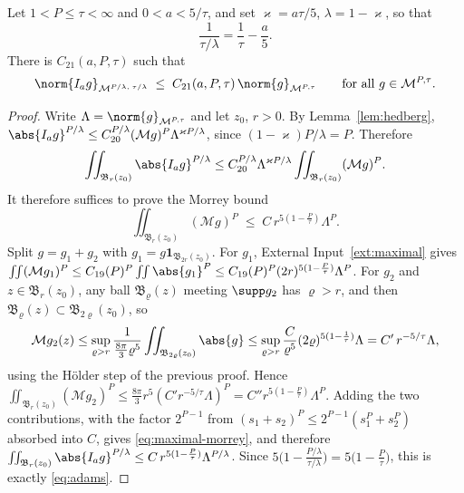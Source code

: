 \documentclass[11pt,reqno]{amsart}
\begin{document}
\begin{corollary}\label{cor:adams}
Let $1<P\le\tau<\infty$ and $0<a<5/\tau$, and set $\varkappa=a\tau/5$,
$\lambda=1-\varkappa$, so that
\begin{equation}\label{eq:adams-exponents}
  \frac{1}{\tau/\lambda}=\frac1\tau-\frac a5 .
\end{equation}
There is $C_{21}(a,P,\tau)$ such that
\begin{equation}\label{eq:adams}
  \norm{I_{a}g}_{\mathcal{M}^{P/\lambda,\;\tau/\lambda}}
  \;\le\;C_{21}(a,P,\tau)\,\norm{g}_{\mathcal{M}^{P,\tau}}
  \qquad\text{for all }g\in\mathcal{M}^{P,\tau}.
\end{equation}
\end{corollary}

\begin{proof}
Write $\Lambda=\norm{g}_{\mathcal{M}^{P,\tau}}$ and let $z_{0}$, $r>0$. By
Lemma~\ref{lem:hedberg},
$\abs{I_{a}g}^{P/\lambda}\le C_{20}^{P/\lambda}
  (\mathcal{M}g)^{P}\Lambda^{\varkappa P/\lambda}$, since
$(1-\varkappa)P/\lambda=P$. Therefore
\[
  \iint_{\mathfrak{B}_{r}(z_{0})}\abs{I_{a}g}^{P/\lambda}
  \le C_{20}^{P/\lambda}\Lambda^{\varkappa P/\lambda}
     \iint_{\mathfrak{B}_{r}(z_{0})}(\mathcal{M}g)^{P} .
\]
It therefore suffices to prove the Morrey bound
\begin{equation}\label{eq:maximal-morrey}
  \iint_{\mathfrak{B}_{r}(z_{0})}(\mathcal{M}g)^{P}
  \;\le\;C\,r^{5(1-\frac P\tau)}\Lambda^{P}.
\end{equation}
Split $g=g_{1}+g_{2}$ with $g_{1}=g\mathbf{1}_{\mathfrak{B}_{2r}(z_{0})}$. For
$g_{1}$, External Input~\ref{ext:maximal} gives
$\iint(\mathcal{M}g_{1})^{P}\le C_{19}(P)^{P}\iint\abs{g_{1}}^{P}
 \le C_{19}(P)^{P}(2r)^{5(1-\frac P\tau)}\Lambda^{P}$.
For $g_{2}$ and $z\in\mathfrak{B}_{r}(z_{0})$, any ball
$\mathfrak{B}_{\varrho}(z)$ meeting $\supp g_{2}$ has $\varrho>r$, and then
$\mathfrak{B}_{\varrho}(z)\subset\mathfrak{B}_{2\varrho}(z_{0})$, so
\[
  \mathcal{M}g_{2}(z)\le\sup_{\varrho>r}
    \frac{1}{\tfrac{8\pi}{3}\varrho^{5}}\iint_{\mathfrak{B}_{2\varrho}(z_{0})}\abs{g}
  \le\sup_{\varrho>r}\frac{C}{\varrho^{5}}(2\varrho)^{5(1-\frac1\tau)}\Lambda
  = C'\,r^{-5/\tau}\Lambda ,
\]
using the H\"older step of the previous proof. Hence
$\iint_{\mathfrak{B}_{r}(z_{0})}(\mathcal{M}g_{2})^{P}
 \le\tfrac{8\pi}{3}r^{5}(C'r^{-5/\tau}\Lambda)^{P}
 =C''r^{5(1-\frac P\tau)}\Lambda^{P}$. Adding the two contributions, with the factor $2^{P-1}$ from
$(s_{1}+s_{2})^{P}\le2^{P-1}(s_{1}^{P}+s_{2}^{P})$ absorbed into $C$, gives
\eqref{eq:maximal-morrey}, and therefore
$\iint_{\mathfrak{B}_{r}(z_{0})}\abs{I_{a}g}^{P/\lambda}
 \le C\,r^{5(1-\frac P\tau)}\Lambda^{P/\lambda}$. Since
$5\bigl(1-\frac{P/\lambda}{\tau/\lambda}\bigr)=5\bigl(1-\frac P\tau\bigr)$, this
is exactly \eqref{eq:adams}.
\end{proof}
\end{document}
